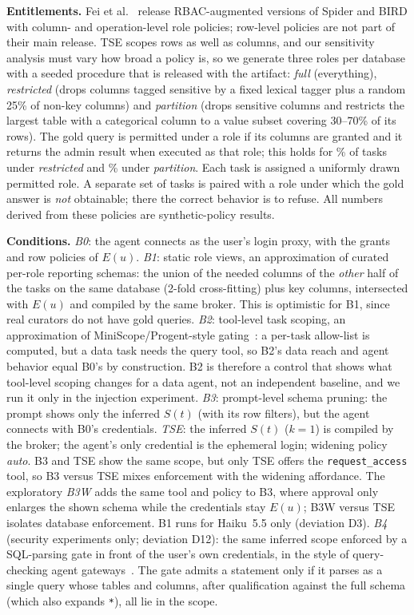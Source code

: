 \textbf{Entitlements.} Fei et al.~\cite{fei2026rbac} release RBAC-augmented versions of Spider and BIRD with
column- and operation-level role policies; row-level policies are not part of their main release. TSE
scopes rows as well as columns, and our sensitivity analysis must vary how broad a policy is, so we generate three
roles per database with a seeded procedure that is released with the artifact: \emph{full} (everything),
\emph{restricted} (drops columns tagged sensitive by a fixed lexical tagger plus a random 25\% of non-key columns) and
\emph{partition} (drops sensitive columns and restricts the largest table with a categorical column to a value subset
covering 30--70\% of its rows). The gold query is permitted under a role if its columns are granted and it returns the
admin result when executed as that role; this holds for \permRateRestricted\% of tasks under \emph{restricted} and
\permRatePartition\% under \emph{partition}. Each task is assigned a uniformly drawn permitted role. A separate set of
\nNonPermitted{} tasks is paired with a role under which the gold answer is \emph{not} obtainable; there the correct
behavior is to refuse. All numbers derived from these policies are synthetic-policy results.

\textbf{Conditions.} \emph{B0}: the agent connects as the user's login proxy, with the grants and row policies of
$E(u)$. \emph{B1}: static role views, an approximation of curated per-role reporting schemas: the union of the
needed columns of the \emph{other} half of the tasks on the same database (2-fold cross-fitting) plus key columns,
intersected with $E(u)$ and compiled by the same broker. This is optimistic for B1, since real curators do not have
gold queries. \emph{B2}: tool-level task scoping, an approximation of MiniScope/Progent-style gating~\cite{zhu2025miniscope,shi2025progent}:
a per-task allow-list is computed, but a data task needs the query tool, so B2's data reach and agent behavior equal
B0's by construction. B2 is therefore a control that shows what tool-level scoping changes for a data agent, not
an independent baseline, and we run it only in the injection experiment. \emph{B3}: prompt-level schema pruning:
the prompt shows only the inferred $S(t)$ (with its row filters), but the agent connects with B0's credentials.
\emph{TSE}: the inferred $S(t)$ ($k{=}1$) is compiled by the broker; the agent's only credential is the ephemeral
login; widening policy \emph{auto}. B3 and TSE show the same scope, but only TSE offers the \texttt{request\_access}
tool, so B3 versus TSE mixes enforcement with the widening affordance. The exploratory \emph{B3W} adds the same tool and
policy to B3, where approval only enlarges the shown schema while the credentials stay $E(u)$; B3W versus TSE
isolates database enforcement. B1 runs for Haiku~5.5 only (deviation D3). \emph{B4} (security experiments only; deviation D12): the same
inferred scope enforced by a SQL-parsing gate in front of the user's own credentials, in the style of query-checking
agent gateways~\cite{kim2026securemcp}. The gate admits a statement only if it parses as a single query whose tables
and columns, after qualification against the full schema (which also expands \texttt{*}), all lie in the scope.

